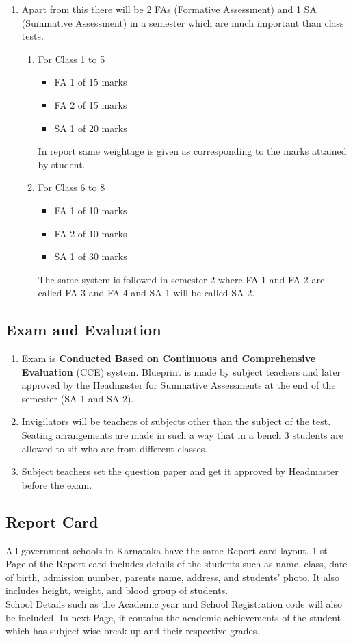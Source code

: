 \begin{enumerate}
    \item Apart from this there will be 2 FAs (Formative Assessment) and 1 SA (Summative Assessment) in a semester which are much important than class tests. 
    \begin{enumerate}
        \item For Class 1 to 5
        \begin{itemize}
            \item FA 1 of 15 marks
            \item FA 2 of 15 marks 
            \item SA 1 of 20 marks
        \end{itemize}
        In report same weightage is given as corresponding to the marks attained by student. 
        \item For Class 6 to 8
        \begin{itemize}
            \item FA 1 of 10 marks
            \item FA 2 of 10 marks 
            \item SA 1 of 30 marks
        \end{itemize}
          The same system is followed in semester 2 where FA 1 and FA 2 are called FA 3 and FA 4 and SA 1 will be called SA 2.
    \end{enumerate}
    \end{enumerate}
    
\subsection{Exam and Evaluation}
\begin{enumerate}
\item Exam is \textbf{Conducted Based on Continuous and Comprehensive 
Evaluation} (CCE) system. Blueprint is made by subject teachers and 
later approved by the Headmaster for Summative Assessments at the end of 
the semester (SA 1 and SA 2).
\item Invigilators will be teachers of subjects other than the subject of the test. Seating arrangements are made in such a way that in a bench 3 
students are allowed to sit who are from different classes. 
\item Subject teachers set the question paper and get it approved by Headmaster before the exam. 
\end{enumerate}

\subsection{Report Card} 
All government schools in Karnataka have the same Report card layout. 1 st Page of the Report card includes details of the students such as name, class, date of birth, admission number, parents name, address, and students' photo. It also includes height, weight, and blood group of students. \\
School Details such as the Academic year and School Registration code will also be included. In next Page, it contains the academic achievements of the student which has subject wise break-up and their respective grades. 


